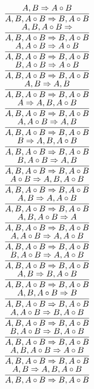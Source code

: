 \documentclass[11pt]{article}
\begin{document}
\begin{center}
\bigskip
\\$\infer{A, B, A\circ B\Rightarrow B, A\circ B}{A, B\Rightarrow A\circ B}$
\bigskip
\\$\infer{A, B, A\circ B\Rightarrow B, A\circ B}{A, B, A\circ B\Rightarrow }$
\bigskip
\\$\infer{A, B, A\circ B\Rightarrow B, A\circ B}{A, A\circ B\Rightarrow A\circ B}$
\bigskip
\\$\infer{A, B, A\circ B\Rightarrow B, A\circ B}{B, A\circ B\Rightarrow A\circ B}$
\bigskip
\\$\infer{A, B, A\circ B\Rightarrow B, A\circ B}{A, B\Rightarrow A, B}$
\bigskip
\\$\infer{A, B, A\circ B\Rightarrow B, A\circ B}{A\Rightarrow A, B, A\circ B}$
\bigskip
\\$\infer{A, B, A\circ B\Rightarrow B, A\circ B}{A, A\circ B\Rightarrow A, B}$
\bigskip
\\$\infer{A, B, A\circ B\Rightarrow B, A\circ B}{B\Rightarrow A, B, A\circ B}$
\bigskip
\\$\infer{A, B, A\circ B\Rightarrow B, A\circ B}{B, A\circ B\Rightarrow A, B}$
\bigskip
\\$\infer{A, B, A\circ B\Rightarrow B, A\circ B}{A\circ B\Rightarrow A, B, A\circ B}$
\bigskip
\\$\infer{A, B, A\circ B\Rightarrow B, A\circ B}{A, B\Rightarrow A, A\circ B}$
\bigskip
\\$\infer{A, B, A\circ B\Rightarrow B, A\circ B}{A, B, A\circ B\Rightarrow A}$
\bigskip
\\$\infer{A, B, A\circ B\Rightarrow B, A\circ B}{A, A\circ B\Rightarrow A, A\circ B}$
\bigskip
\\$\infer{A, B, A\circ B\Rightarrow B, A\circ B}{B, A\circ B\Rightarrow A, A\circ B}$
\bigskip
\\$\infer{A, B, A\circ B\Rightarrow B, A\circ B}{A, B\Rightarrow B, A\circ B}$
\bigskip
\\$\infer{A, B, A\circ B\Rightarrow B, A\circ B}{A, B, A\circ B\Rightarrow B}$
\bigskip
\\$\infer{A, B, A\circ B\Rightarrow B, A\circ B}{A, A\circ B\Rightarrow B, A\circ B}$
\bigskip
\\$\infer{A, B, A\circ B\Rightarrow B, A\circ B}{B, A\circ B\Rightarrow B, A\circ B}$
\bigskip
\\$\infer{A, B, A\circ B\Rightarrow B, A\circ B}{A, B, A\circ B\Rightarrow A\circ B}$
\bigskip
\\$\infer{A, B, A\circ B\Rightarrow B, A\circ B}{A, B\Rightarrow A, B, A\circ B}$

\end{center}
\end{document}
